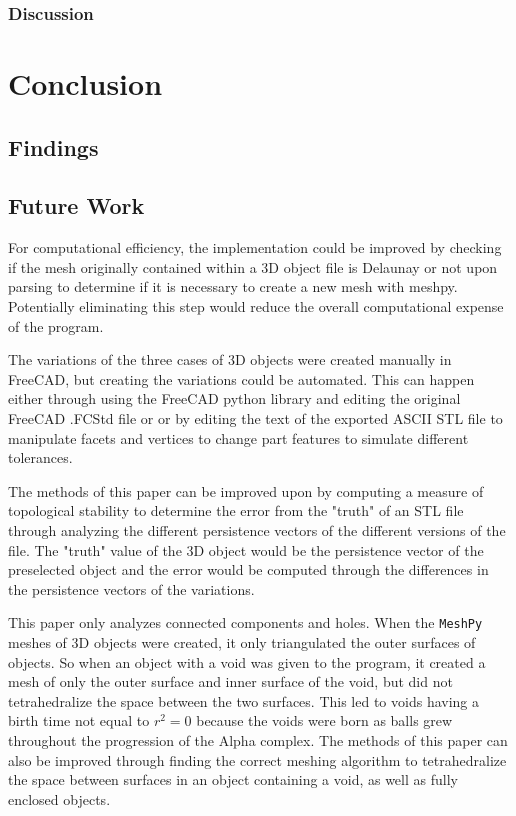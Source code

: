 \documentclass[ma]{uncgdissertationexp}
\theoremstyle{plain}
\theoremstyle{definition}
\theoremstyle{remark}
\begin{document}
\subsection{Discussion}

\chapter{Conclusion}
\section{Findings}

\section{Future Work}
\par For computational efficiency, the implementation could be improved by checking if the mesh originally contained within a 3D object file is Delaunay or not upon parsing to determine if it is necessary to create a new mesh with meshpy. Potentially eliminating this step would reduce the overall computational expense of the program.
\par The variations of the three cases of 3D objects were created manually in FreeCAD, but creating the variations could be automated. This can happen either through using the FreeCAD python library and editing the original FreeCAD .FCStd file or or by editing the text of the exported ASCII STL file to manipulate facets and vertices to change part features to simulate different tolerances.
\par The methods of this paper can be improved upon by computing a measure of topological stability to determine the error from the "truth" of an STL file through analyzing the different persistence vectors of the different versions of the file. The "truth" value of the 3D object would be the persistence vector of the preselected object and the error would be computed through the differences in the persistence vectors of the variations.
\par This paper only analyzes connected components and holes. When the \verb"MeshPy" meshes of 3D objects were created, it only triangulated the outer surfaces of objects. So when an object with a void was given to the program, it created a mesh of only the outer surface and inner surface of the void, but did not tetrahedralize the space between the two surfaces. This led to voids having a birth time not equal to $r^{2}=0$ because the voids were born as balls grew throughout the progression of the Alpha complex. The methods of this paper can also be improved through finding the correct meshing algorithm to tetrahedralize the space between surfaces in an object containing a void, as well as fully enclosed objects.



\backmatter
\end{document}
